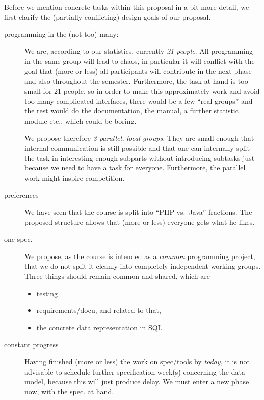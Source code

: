 \documentclass[11pt,handout,nologo]{handout}
\begin{document}
Before we mention concrete tasks within this proposal in a bit more detail,
we first clarify the (partially conflicting) design goals of our proposal.
\begin{description}
\item[programming in the (not too) many:] We are, according to our
  statistics, currently \emph{21 people}. All programming in the same group
  will lead to chaos, in particular it will conflict with the goal that
  (more or less) all participants will contribute in the next phase and
  also throughout the semester. Furthermore, the task at hand is too small
  for 21 people, so in order to make this approximately work and avoid too
  many complicated interfaces, there would be a few ``real groups'' and the
  rest would do the documentation, the manual, a further statistic module
  etc., which could be boring.
  
  We propose therefore \emph{3 parallel, local groups.} They are small
  enough that internal communication is still possible and that one can
  internally split the task in interesting enough subparts without
  introducing subtasks just because we need to have a task for everyone.
  Furthermore, the parallel work might inspire competition.
\item[preferences] We have seen that the course is split into ``PHP vs.\ 
  Java'' fractions. The proposed structure allows that (more or less)
  everyone gets what he likes.
\item[one spec.] We propose, as the course is intended as a \emph{common}
  programming project, that we do not split it cleanly into completely
  independent working groups. Three things should remain common and shared,
  which are
  \begin{itemize}
  \item testing
  \item requirements/docu, and related to that, 
  \item the concrete data representation in SQL
  \end{itemize}
\item[constant progress] Having finished (more or less) the work on
  spec/tools by \emph{today,} it is not advisable to schedule further
  specification week(s) concerning the data-model, because this will just
  produce delay. We must enter a new phase now, with the spec. at hand.
\end{description}
\end{document}
